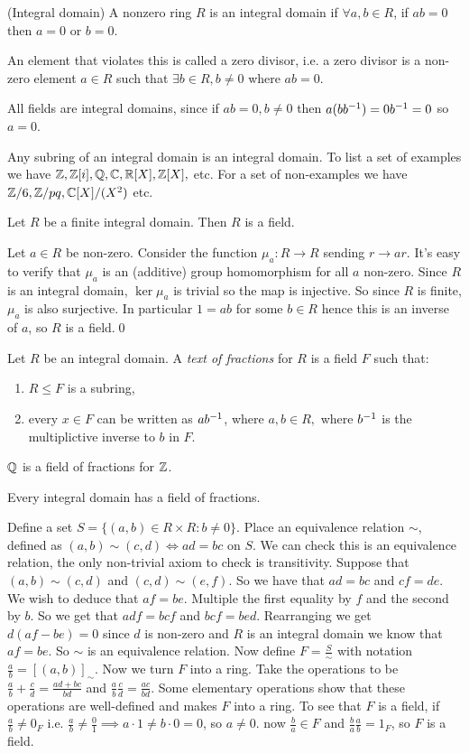 \documentclass{article}
\begin{document}
\begin{definition}
	(Integral domain) A nonzero ring $ R $ is an integral domain if $ \forall a,b\in R $, if $ ab=0 $ then $ a=0 $ or $ b=0 $.
\end{definition}
An element that violates this is called a zero divisor, i.e. a zero divisor is a non-zero element $ a\in R $ such that $ \exists b\in R, b\ne 0 $ where $ ab=0 $.\par
All fields are integral domains, since if $ ab=0, b\ne 0 $ then $ a(b{b}^{-1})=0{b}^{-1}=0 $ so $ a=0 $.\par
Any subring of an integral domain is an integral domain. To list a set of examples we have $ \mathbb{Z},\mathbb{Z}[i],\mathbb{Q},\mathbb{C},\mathbb{R}[X],\mathbb{Z}[X], $ etc.
For a set of non-examples we have $ \mathbb{Z}/6, \mathbb{Z}/pq, \mathbb{C}[X]/(X^2) $ etc.
\begin{lemma}
  Let $ R $ be a finite integral domain. Then $ R $ is a field.
\end{lemma}
\pf Let $ a\in R $ be non-zero. Consider the function $ \mu_a: R\to R $ sending $ r\to ar $. It's easy to verify that $ \mu_a $ is an (additive) group homomorphism for all $ a $ non-zero. Since $ R $ is an integral domain, $ \ker\mu_a $ is trivial so the map is injective. So since $ R $ is finite, $ \mu_a $ is also surjective. In particular $ 1=ab $ for some $ b\in R $ hence this is an inverse of $ a $, so $ R $ is a field.\qed
\begin{definition}
	Let $ R $ be an integral domain. A \textit{text of fractions} for $ R $ is a field $ F $ such that:
	\begin{enumerate}
		\item $ R\le F $ is a subring,
		\item every $ x\in F $ can be written as $ a{b}^{-1} $, where $ a,b\in R, $ where $ {b}^{-1} $ is the multiplictive inverse to $ b $ in $ F $.
	\end{enumerate}
\end{definition}
$ \mathbb{Q} $ is a field of fractions for $ \mathbb{Z} $.
\begin{theorem}
  Every integral domain has a field of fractions.
\end{theorem}
\pf Define a set $ S=\{(a,b)\in R\times R:b\ne 0\} $. Place an equivalence relation $ \sim $, defined as $ (a,b)\sim (c,d)\iff ad=bc $ on $ S $. We can check this is an equivalence relation, the only non-trivial axiom to check is transitivity. Suppose that $ (a,b)\sim (c,d) $ and $ (c,d)\sim (e,f) $. So we have that $ ad=bc $ and $ cf=de $. We wish to deduce that $ af=be $. Multiple the first equality by $ f $ and the second by $ b $. So we get that $ adf=bcf $ and $ bcf=bed $. Rearranging we get $ d(af-be)=0 $ since $ d $ is non-zero and $ R $ is an integral domain we know that $ af=be $. So $ \sim $ is an equivalence relation. Now define $ F=\frac S\sim $ with notation $ \frac ab = [(a,b)]_\sim $. Now we turn $ F $ into a ring. Take the operations to be $ \frac ab + \frac cd = \frac {ad+bc}{bd} $ and $ \frac ab\frac cd = \frac{ac}{bd} $. Some elementary operations show that these operations are well-defined and makes $ F $ into a ring. To see that $ F $ is a field, if $ \frac ab\ne 0_F $ i.e. $ \frac ab\ne \frac 01\implies a\cdot 1\ne b\cdot 0 =0  $, so $ a\ne 0 $. now $ \frac ba \in F $ and $ \frac ba\frac ab=1_F $, so $ F $ is a field.\par
\end{document}
